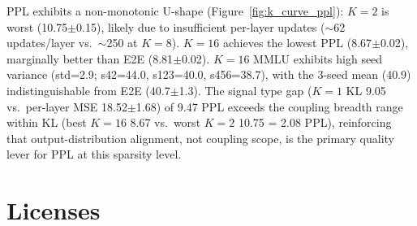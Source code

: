 \begin{table}[h]
\centering
\caption{K-curve: coupling breadth vs.\ predictor quality (30\%, TEAL uniform, LLaMA-3.1-8B). All values are 3-seed mean$\pm$std (s42/s123/s456) except $K{=}1$ downstream (single seed). ``---'' = not evaluated.}
\label{tab:k_curve}
\end{table}

PPL exhibits a non-monotonic U-shape (Figure~\ref{fig:k_curve_ppl}): $K{=}2$ is worst (10.75$\pm$0.15), likely due to insufficient per-layer updates (${\sim}$62 updates/layer vs.\ ${\sim}$250 at $K{=}8$). $K{=}16$ achieves the lowest PPL (8.67$\pm$0.02), marginally better than E2E (8.81$\pm$0.02). $K{=}16$ MMLU exhibits high seed variance (std=2.9; s42=44.0, s123=40.0, s456=38.7), with the 3-seed mean (40.9) indistinguishable from E2E (40.7$\pm$1.3).
The signal type gap ($K{=}1$ KL 9.05 vs.\ per-layer MSE 18.52$\pm$1.68) of 9.47 PPL exceeds the coupling breadth range within KL (best $K{=}16$ 8.67 vs.\ worst $K{=}2$ 10.75 = 2.08 PPL), reinforcing that output-distribution alignment, not coupling scope, is the primary quality lever for PPL at this sparsity level. %

\section{Licenses}
\label{app:licenses}

